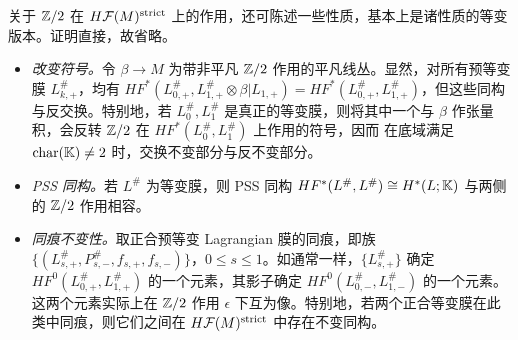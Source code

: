 关于 $\mathbb Z/2$ 在 $H\mathcal F(M)^{\mathrm{strict}}$ 上的作用，还可陈述一些性质，基本上是诸性质的等变版本。证明直接，故省略。
\begin{itemize}
\item \emph{改变符号。}令 $\beta\to M$ 为带非平凡 $\mathbb Z/2$ 作用的平凡线丛。显然，对所有预等变膜 $L_{k,\allowbreak +}^\#$，均有 $HF^*(L_{0,\allowbreak +}^\#,\allowbreak L_{1,\allowbreak +}^\#\otimes\beta|L_{1,\allowbreak +})=HF^*(L_{0,\allowbreak +}^\#,\allowbreak L_{1,\allowbreak +}^\#)$，但这些同构与反交换。特别地，若 $L_0^\#,\allowbreak L_1^\#$ 是真正的等变膜，则将其中一个与 $\beta$ 作张量积，会反转 $\mathbb Z/2$ 在 $HF^*(L_0^\#,\allowbreak L_1^\#)$ 上作用的符号，因而
在底域满足 $\operatorname{char}(\mathbb K)\ne2$ 时，交换不变部分与反不变部分。
\item \emph{PSS 同构。}若 $L^\#$ 为等变膜，则 PSS 同构 $HF^*(L^\#,\allowbreak L^\#)\cong H^*(L;\mathbb K)$ 与两侧的 $\mathbb Z/2$ 作用相容。
\item \emph{同痕不变性。}取正合预等变 Lagrangian 膜的同痕，即族 $\{(L_{s,\allowbreak +}^\#,\allowbreak P_{s,\allowbreak -}^\#,\allowbreak f_{s,\allowbreak +},\allowbreak f_{s,\allowbreak -})\}$，$0\leq s\leq1$。如通常一样，$\{L_{s,\allowbreak +}^\#\}$ 确定 $HF^0(L_{0,\allowbreak +}^\#,\allowbreak L_{1,\allowbreak +}^\#)$ 的一个元素，其影子确定 $HF^0(L_{0,\allowbreak -}^\#,\allowbreak L_{1,\allowbreak -}^\#)$ 的一个元素。这两个元素实际上在 $\mathbb Z/2$ 作用 $\epsilon$ 下互为像。特别地，若两个正合等变膜在此类中同痕，则它们之间在 $H\mathcal F(M)^{\mathrm{strict}}$ 中存在不变同构。
\end{itemize}

